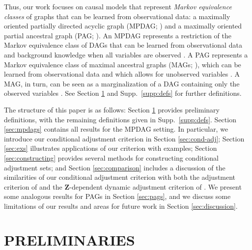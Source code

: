 \documentclass[twoside]{article}
\newcommand{\mb}[1]{\mathbf{#1}}
\begin{document}
Thus, our work focuses on causal models that represent \textit{Markov equivalence classes} of graphs that can be learned from observational data: a maximally oriented partially directed acyclic graph (MPDAG; \citealp{meek1995causal}) and a maximally oriented partial ancestral graph (PAG; \citealp{richardson2002ancestral}). An MPDAG represents a restriction of the Markov equivalence class of DAGs that can be learned from observational data and background knowledge when all variables are observed \citep{andersson1997characterization, meek1995causal, chickering2002learning}. A PAG represents a Markov equivalence class of maximal ancestral graphs (MAGs; \citealp{richardson2002ancestral}), which can be learned from observational data and which allows for unobserved variables \citep{spirtes2000causation, zhang2008completeness, ali2009markov}. A MAG, in turn, can be seen as a marginalization of a DAG containing only the observed variables \citep{richardson2002ancestral}. See Section \ref{sec:prelim} and Supp.\ \ref{supp:defs} for further definitions.


The structure of this paper is as follows: Section \ref{sec:prelim} provides preliminary definitions, with the remaining definitions given in Supp.\ \ref{supp:defs}. Section \ref{sec:mpdags} contains all results for the MPDAG setting. In particular, we introduce our conditional adjustment criterion in Section \ref{sec:cond-adj}; Section \ref{sec:exs} illustrates applications of our criterion with examples; Section \ref{sec:constructing} provides several methods for constructing conditional adjustment sets; and Section \ref{sec:comparison} includes a discussion of the similarities of our conditional adjustment criterion with both the adjustment criterion of \cite{perkovic2017interpreting} and the $\mb{Z}$-dependent dynamic adjustment criterion of \cite{smucler2020efficient}. We present some analogous results for PAGs in Section \ref{sec:pags}, and we discuss some limitations of our results and areas for future work in Section \ref{sec:discussion}. 





 









\section{PRELIMINARIES}
\label{sec:prelim}
\end{document}
